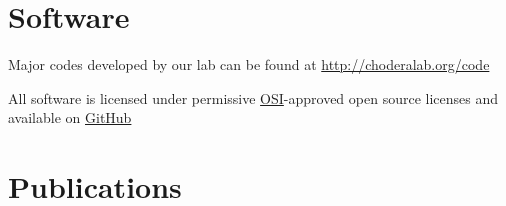 \documentclass[10pt]{article}
\begin{document}

\eject


\section*{Software}


Major codes developed by our lab can be found at \url{http://choderalab.org/code}

All software is licensed under permissive \href{http://opensource.org}{OSI}-approved open source licenses and available on \href{http://github.com/choderalab}{GitHub}


\section*{Publications}

\end{document}
